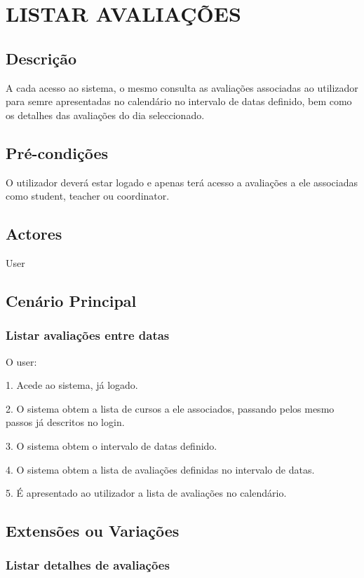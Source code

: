 \section{LISTAR AVALIAÇÕES}

\subsection{Descrição}
A cada acesso ao sistema, o mesmo consulta as avaliações associadas ao utilizador para semre apresentadas no calendário no intervalo de datas definido, bem como os detalhes das avaliações do dia seleccionado.

\subsection{Pré-condições}
O utilizador deverá estar logado e apenas terá acesso a avaliações a ele associadas como student, teacher ou coordinator.

\subsection{Actores}
User

\subsection{Cenário Principal}

\subsubsection{Listar avaliações entre datas} 
O user:

1. Acede ao sistema, já logado.

2. O sistema obtem a lista de cursos a ele associados, passando pelos mesmo passos já descritos no login.

3. O sistema obtem o intervalo de datas definido.

4. O sistema obtem a lista de avaliações definidas no intervalo de datas.

5. É apresentado ao utilizador a lista de avaliações no calendário.

\subsection{Extensões ou Variações} 
\subsubsection{Listar detalhes de avaliações}

